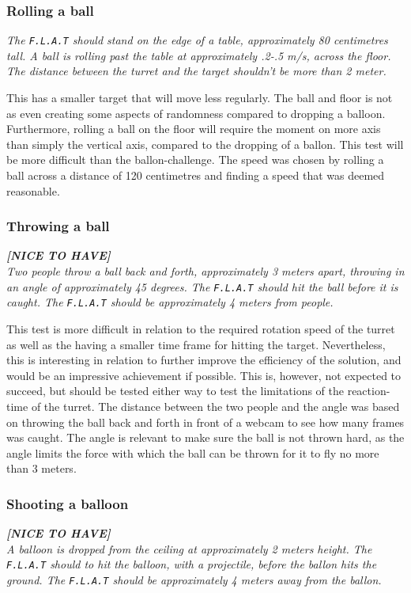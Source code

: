\subsubsection{Rolling a ball}
\textit{The \texttt{F.L.A.T} should stand on the edge of a table, approximately 80 centimetres tall.
A ball is rolling past the table at approximately .2-.5 m/s, across the floor. 
The distance between the turret and the target shouldn't be more than 2 meter.}

This has a smaller target that will move less regularly.
The ball and floor is not as even creating some aspects of randomness compared to dropping a balloon.
Furthermore, rolling a ball on the floor will require the moment on more axis than simply the vertical axis, compared to the dropping of a ballon.
This test will be more difficult than the ballon-challenge.
The speed was chosen by rolling a ball across a distance of 120 centimetres and finding a speed that was deemed reasonable.

\subsubsection{Throwing a ball}
\textit{\textbf{[NICE TO HAVE]}}\\
\textit{Two people throw a ball back and forth, approximately 3 meters apart, throwing in an angle of approximately 45 degrees.
The \texttt{F.L.A.T} should hit the ball before it is caught.
The \texttt{F.L.A.T} should be approximately 4 meters from people.}

This test is more difficult in relation to the required rotation speed of the turret as well as the having a smaller time frame for hitting the target.
Nevertheless, this is interesting in relation to further improve the efficiency of the solution, and would be an impressive achievement if possible.
This is, however, not expected to succeed, but should be tested either way to test the limitations of the reaction-time of the turret.
The distance between the two people and the angle was based on throwing the ball back and forth in front of a webcam to see how many frames was caught.
The angle is relevant to make sure the ball is not thrown hard, as the angle limits the force with which the ball can be thrown for it to fly no more than 3 meters. 
\subsubsection{Shooting a balloon}
\textit{\textbf{[NICE TO HAVE]}}\\
\textit{A balloon is dropped from the ceiling at approximately 2 meters height.	
The \texttt{F.L.A.T} should to hit the balloon, with a projectile, before the ballon hits the ground.
The \texttt{F.L.A.T} should be approximately 4 meters away from the ballon.}

